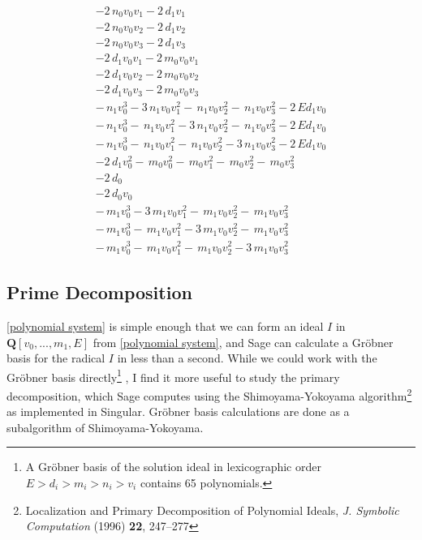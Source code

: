 \documentclass{article}
\begin{document}
\begin{equation}
\begin{array}{r}
-2 \, n_{0} v_{0} v_{1} - 2 \, d_{1} v_{1} \\
-2 \, n_{0} v_{0} v_{2} - 2 \, d_{1} v_{2} \\
-2 \, n_{0} v_{0} v_{3} - 2 \, d_{1} v_{3} \\
-2 \, d_{1} v_{0} v_{1} - 2 \, m_{0} v_{0} v_{1} \\
-2 \, d_{1} v_{0} v_{2} - 2 \, m_{0} v_{0} v_{2} \\
-2 \, d_{1} v_{0} v_{3} - 2 \, m_{0} v_{0} v_{3} \\
- \, n_{1} v_{0}^{3} - 3 \, n_{1} v_{0} v_{1}^{2} -  \, n_{1} v_{0} v_{2}^{2} -  \, n_{1} v_{0} v_{3}^{2} - 2 \, E d_{1} v_{0} \\
- \, n_{1} v_{0}^{3} -  \, n_{1} v_{0} v_{1}^{2} - 3 \, n_{1} v_{0} v_{2}^{2} -  \, n_{1} v_{0} v_{3}^{2} - 2 \, E d_{1} v_{0} \\
- \, n_{1} v_{0}^{3} -  \, n_{1} v_{0} v_{1}^{2} -  \, n_{1} v_{0} v_{2}^{2} - 3 \, n_{1} v_{0} v_{3}^{2} - 2 \, E d_{1} v_{0} \\
-2 \, d_{1} v_{0}^{2} -  \, m_{0} v_{0}^{2} -  \, m_{0} v_{1}^{2} -  \, m_{0} v_{2}^{2} -  \, m_{0} v_{3}^{2} \\
-2 \, d_{0} \\
-2 \, d_{0} v_{0} \\
- \, m_{1} v_{0}^{3} - 3 \, m_{1} v_{0} v_{1}^{2} -  \, m_{1} v_{0} v_{2}^{2} -  \, m_{1} v_{0} v_{3}^{2} \\
- \, m_{1} v_{0}^{3} -  \, m_{1} v_{0} v_{1}^{2} - 3 \, m_{1} v_{0} v_{2}^{2} -  \, m_{1} v_{0} v_{3}^{2} \\
- \, m_{1} v_{0}^{3} -  \, m_{1} v_{0} v_{1}^{2} -  \, m_{1} v_{0} v_{2}^{2} - 3 \, m_{1} v_{0} v_{3}^{2}
\end{array}
\end{equation}

\subsection*{Prime Decomposition}

\eqref{polynomial system} is simple enough that we can form
an ideal $I$ in $\mathbf{Q}[v_0,...,m_1,E]$ from \eqref{polynomial system}, and
Sage can calculate a Gr\"obner basis for the radical $I$ in less than a second.
While we could work with the Gr\"obner basis directly\footnote{A Gr\"obner basis
of the solution ideal in lexicographic order $E>d_i>m_i>n_i>v_i$ contains 65 polynomials.}
, I find it more
useful to study the primary decomposition, which Sage computes using
the Shimoyama-Yokoyama algorithm\footnote{Localization and Primary Decomposition of
Polynomial Ideals, {\it J. Symbolic Computation} (1996) {\bf 22}, 247–277}
as implemented in Singular.  Gr\"obner basis calculations are done
as a subalgorithm of Shimoyama-Yokoyama.
\end{document}

